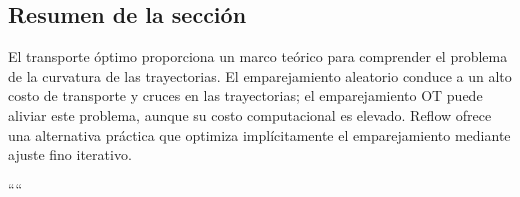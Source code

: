 \subsection{Resumen de la sección}

El transporte óptimo proporciona un marco teórico para comprender el problema de la curvatura de las trayectorias. El emparejamiento aleatorio conduce a un alto costo de transporte y cruces en las trayectorias; el emparejamiento OT puede aliviar este problema, aunque su costo computacional es elevado. Reflow ofrece una alternativa práctica que optimiza implícitamente el emparejamiento mediante ajuste fino iterativo.

````
